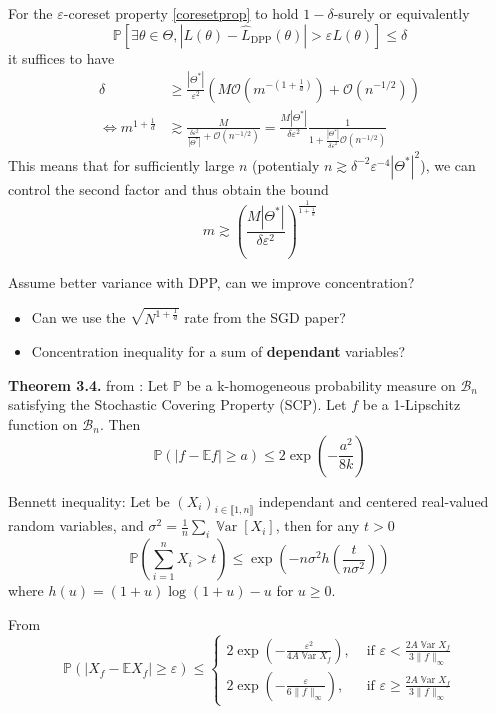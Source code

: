 \documentclass{article} %
\renewcommand{\epsilon}{\varepsilon}
\newcommand{\PP}{\mathbb{P}}
\newcommand{\OO}{\mathcal{O}}
\newcommand{\Var}{\operatorname{\mathbb V ar}}
\newcommand{\1}{\mathds{1}} %
\newcommand{\intint}[2]{\llbracket #1,#2 \rrbracket} %
\theoremstyle{definition} %
\begin{document}
For the $\epsilon$-coreset property \ref{coresetprop} to hold $1-\delta$-surely or equivalently  
\begin{equation}
	\PP \left[ \exists \theta \in \Theta,  |L(\theta)-\hat L_{\textrm{DPP}}(\theta)|>\epsilon L(\theta)\right] \leq \delta
\end{equation}
it suffices to have
\begin{align}
	\delta &\geq \frac{|\Theta^*|}{\epsilon^2} (M \OO(m^{-(1+\frac 1 d)}) + \OO(n^{-1/2})) \\
	\iff m^{1+\frac 1 d} &\gtrsim \frac{M}{\frac{\delta \epsilon^2}{|\Theta^*|} + \OO(n^{-1/2})} = \frac{M |\Theta^*|}{\delta \epsilon^2} \frac{1}{1 + \frac{|\Theta^*|}{\delta \epsilon^2}\OO(n^{-1/2})}
\end{align}
This means that for sufficiently large $n$ (potentialy $n\gtrsim \delta^{-2} \epsilon^{-4} |\Theta^*|^2$), we can control the second factor and thus obtain the bound
\begin{equation}
	\boxed{m \gtrsim \left(\frac{M |\Theta^*|}{\delta \epsilon^2}\right) ^{\frac{1}{1+\frac 1 d}} }
\end{equation}




\begin{tcolorbox}
	Assume better variance with DPP, can we improve concentration?
\begin{itemize}
	\item Can we use the $\sqrt {N^{1 + \frac 1 d}}$ rate from the SGD paper?
	\item Concentration inequality for a sum of \textbf{dependant} variables?
\end{itemize}
\end{tcolorbox}

\textbf{Theorem 3.4.} from \cite{pemantle2011rayleighconcentration}: Let $\mathbb{P}$ be a k-homogeneous probability measure on $\mathcal{B}_{n}$ satisfying the Stochastic Covering Property (SCP). Let $f$ be a 1-Lipschitz function on $\mathcal{B}_{n}$. Then
$$
\mathbb{P}(\lvert f-\mathbb{E} f \rvert \geq a) \leq 2 \exp \left(-\frac{a^{2}}{8 k}\right)
$$

Bennett inequality: Let be $(X_i)_{i\in \intint{1}{n}}$ independant and centered real-valued random variables, and $\sigma^2 = \frac{1}{n}\sum_i \Var[X_i]$, then for any $t>0$
$$
\mathbb{P}\left(\sum_{i=1}^{n} X_{i}>t\right) \leq \exp \left(-n \sigma^{2} h\left(\frac{t}{n \sigma^{2}}\right)\right)
$$
where $h(u)=(1+u) \log (1+u)-u$ for $u \geq 0$.


From \cite{breuer2013nevai} $$\PP\left(\left|X_f-\mathbb{E} X_f\right| \geq \epsilon\right) \leq \begin{cases}2 \exp \left(-\frac{\epsilon^2}{4 A \Var X_f}\right), & \text { if } \epsilon<\frac{2 A \Var X_f}{3\|f\|_{\infty}} \\ 2 \exp \left(-\frac{\epsilon}{6\|f\|_{\infty}}\right), & \text { if } \epsilon \geq \frac{2 A \Var X_f}{3\|f\|_{\infty}}\end{cases}$$
\end{document}
